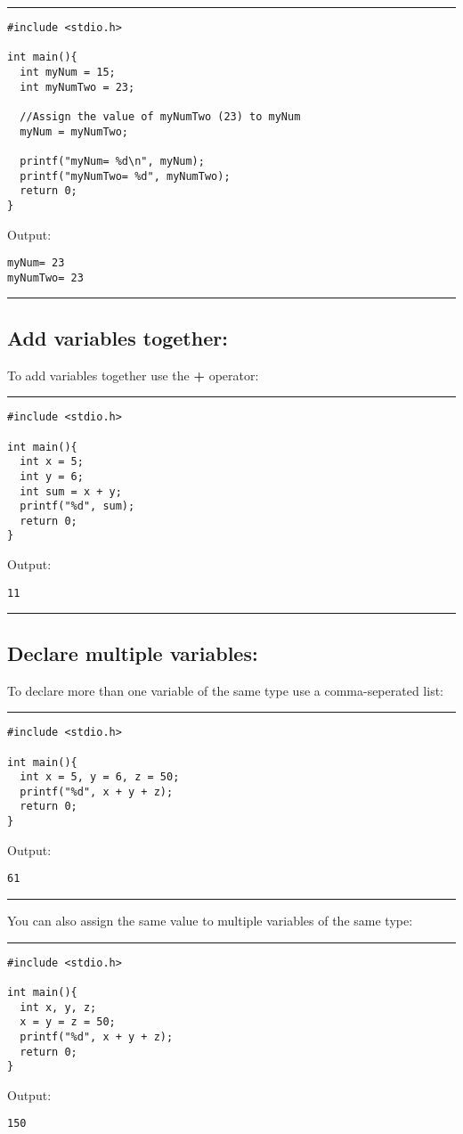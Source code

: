 \documentclass[a4paper]{article}
\begin{document}
\noindent\rule{\textwidth}{0.5pt}
\begin{verbatim}
#include <stdio.h>

int main(){
  int myNum = 15;
  int myNumTwo = 23;

  //Assign the value of myNumTwo (23) to myNum
  myNum = myNumTwo;

  printf("myNum= %d\n", myNum);
  printf("myNumTwo= %d", myNumTwo);
  return 0;
}
\end{verbatim}
Output:
\begin{verbatim}
myNum= 23
myNumTwo= 23
\end{verbatim}

\noindent\rule{\textwidth}{0.5pt}

\subsection{Add variables together:}
\label{sec:org06aa56d}
To add variables together use the \textbf{+} operator:

\noindent\rule{\textwidth}{0.5pt}
\begin{verbatim}
#include <stdio.h>

int main(){
  int x = 5;
  int y = 6;
  int sum = x + y;
  printf("%d", sum);
  return 0;
}
\end{verbatim}
Output:
\begin{verbatim}
11
\end{verbatim}

\noindent\rule{\textwidth}{0.5pt}

\subsection{Declare multiple variables:}
\label{sec:org880bc12}
To declare more than one variable of the same type use a comma-seperated list:

\noindent\rule{\textwidth}{0.5pt}
\begin{verbatim}
#include <stdio.h>

int main(){
  int x = 5, y = 6, z = 50;
  printf("%d", x + y + z);
  return 0;
}
\end{verbatim}
Output:
\begin{verbatim}
61
\end{verbatim}

\noindent\rule{\textwidth}{0.5pt}
You can also assign the same value to multiple variables of the same type:

\noindent\rule{\textwidth}{0.5pt}
\begin{verbatim}
#include <stdio.h>

int main(){
  int x, y, z;
  x = y = z = 50;
  printf("%d", x + y + z);
  return 0;
}
\end{verbatim}
Output:
\begin{verbatim}
150
\end{verbatim}
\end{document}
